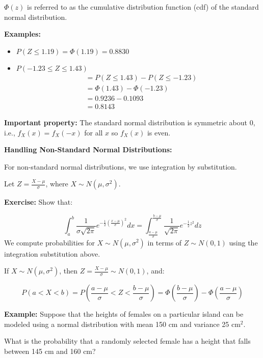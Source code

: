 \documentclass{article}
\begin{document}
    $\Phi(z)$ is referred to as the cumulative distribution function (cdf) of the standard normal distribution.

    \textbf{Examples:}
    \begin{itemize}
        \item $P(Z \leq 1.19) = \Phi(1.19) = 0.8830$
        
        \item $P(-1.23 \leq Z \leq 1.43)$ 
              \begin{align*}
              &= P(Z \leq 1.43) - P(Z \leq -1.23) \\
              &= \Phi(1.43) - \Phi(-1.23) \\
              &= 0.9236 - 0.1093 \\
              &= 0.8143
              \end{align*}
    \end{itemize}

    \textbf{Important property:} The standard normal distribution is symmetric about 0, i.e., $f_X(x) = f_X(-x)$ for all $x$ so $f_X(x)$ is even.

    \textbf{Handling Non-Standard Normal Distributions:}

    For non-standard normal distributions, we use integration by substitution.

    Let $Z = \frac{X - \mu}{\sigma}$, where $X \sim N(\mu, \sigma^2)$.

    \textbf{Exercise:} Show that:

    \[
    \int_{a}^{b} \frac{1}{\sigma \sqrt{2\pi}} e^{-\frac{1}{2} (\frac{x-\mu}{\sigma})^2} dx = \int_{\frac{a-\mu}{\sigma}}^{\frac{b-\mu}{\sigma}} \frac{1}{\sqrt{2\pi}} e^{-\frac{1}{2} z^2} dz
    \]
    We compute probabilities for $X \sim N(\mu, \sigma^2)$ in terms of $Z \sim N(0, 1)$ using the integration substitution above.

    If $X \sim N(\mu, \sigma^2)$, then $Z = \frac{X - \mu}{\sigma} \sim N(0, 1)$, and:

    \[
    P(a < X < b) = P\left(\frac{a - \mu}{\sigma} < Z < \frac{b - \mu}{\sigma}\right) = \Phi\left(\frac{b - \mu}{\sigma}\right) - \Phi\left(\frac{a - \mu}{\sigma}\right)
    \]

    \textbf{Example:} Suppose that the heights of females on a particular island can be modeled using a normal distribution with mean 150 cm and variance 25 cm$^2$.

    What is the probability that a randomly selected female has a height that falls between 145 cm and 160 cm?
\end{document}
